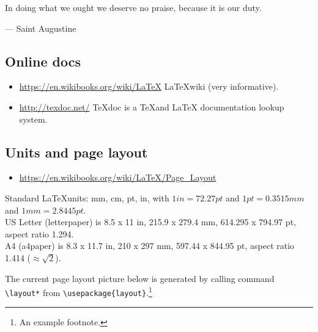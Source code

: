 \documentclass[letterpaper]{article}
\begin{document}
\epigraph
{In doing what we ought we deserve no praise, because it is our duty.}
{--- \textup{Saint Augustine}}

\subsection{Online docs}
\begin{itemize}
    \item \url{https://en.wikibooks.org/wiki/LaTeX} 
          \LaTeX wiki (very informative).
    \item \url{http://texdoc.net/} TeXdoc is a \TeX and \LaTeX
          documentation lookup system.
\end{itemize}

\subsection{Units and page layout}
\begin{itemize}
    \item \url{https://en.wikibooks.org/wiki/LaTeX/Page_Layout}
\end{itemize}
Standard \LaTeX units: mm, cm, pt, in, with $1in = 72.27pt$ and 
$1pt = 0.3515mm$ and $1mm = 2.8445pt$. \\
US Letter (letterpaper) is 8.5 x 11 in, 215.9 x 279.4 mm, 
614.295 x 794.97 pt, aspect ratio 1.294. \\
A4 (a4paper) is 8.3 x 11.7 in, 210 x 297 mm, 597.44 x 844.95 pt, aspect ratio 1.414 
($\approx\sqrt{2}$).

\newpage

The current page layout picture below is generated by calling command\\ 
\verb+\layout*+ from \verb+\usepackage{layout}+.\footnote{An example footnote.} 

\vspace{5mm}

\layout*
\end{document}
